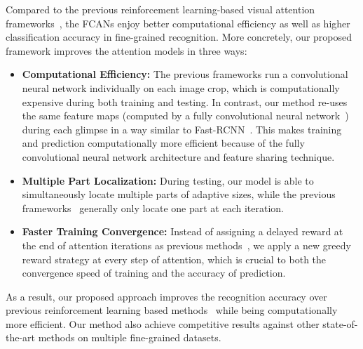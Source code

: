 \documentclass[10pt,twocolumn,letterpaper]{article}
\begin{document}
Compared to the previous reinforcement learning-based visual attention frameworks~\cite{mnih2014recurrent, sermanet2014attention}, the FCANs enjoy better computational efficiency as well as higher classification accuracy in fine-grained recognition.
More concretely, our proposed framework improves the attention models in three ways:
\begin{itemize}
\item{\bf Computational Efficiency:} The previous frameworks run a convolutional neural network individually on each image crop, which is computationally expensive during both training and testing.
In contrast, our method re-uses the same feature maps (computed by a fully convolutional neural network~\cite{szegedy2015going, simonyan2014very}) during each glimpse in a way similar to Fast-RCNN~\cite{girshick2015fast}.
This makes training and prediction computationally more efficient because of the fully convolutional neural network architecture and feature sharing technique.
\item{\bf Multiple Part Localization:} During testing, our model is able to simultaneously locate multiple parts of adaptive sizes, while the previous frameworks~\cite{mnih2014recurrent, sermanet2014attention} generally only locate one part at each iteration.
\item{\bf Faster Training Convergence:} Instead of assigning a delayed reward at the end of attention iterations as previous methods~\cite{mnih2014recurrent, sermanet2014attention}, we apply a new greedy reward strategy at every step of attention, which is crucial to both the convergence speed of training and the accuracy of prediction.
\end{itemize}


As a result, our proposed approach improves the recognition accuracy over previous reinforcement learning based methods~\cite{mnih2014recurrent, sermanet2014attention} while being computationally more efficient.
Our method also achieve competitive results against other state-of-the-art methods on multiple fine-grained datasets.
\end{document}
